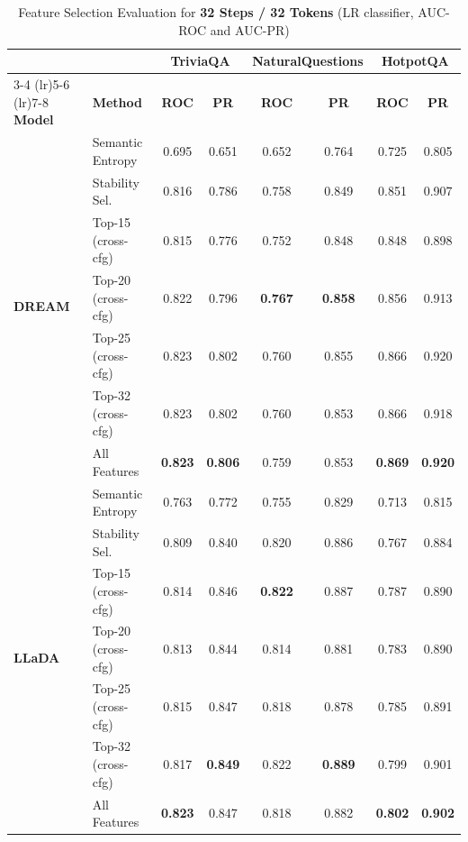 \documentclass{article}
\begin{document}
\begin{table}[htbp]
\centering
\small
\caption{Feature Selection Evaluation for \textbf{32 Steps / 32 Tokens} (LR classifier, AUC-ROC and AUC-PR)}
\label{tab:fs_32steps_32tokens}
\begin{tabular}{llcccccc}
\toprule
 & & \multicolumn{2}{c}{\textbf{TriviaQA}} & \multicolumn{2}{c}{\textbf{NaturalQuestions}} & \multicolumn{2}{c}{\textbf{HotpotQA}} \\
\cmidrule(lr){3-4} \cmidrule(lr){5-6} \cmidrule(lr){7-8}
\textbf{Model} & \textbf{Method} & \textbf{ROC} & \textbf{PR} & \textbf{ROC} & \textbf{PR} & \textbf{ROC} & \textbf{PR} \\
\midrule
\multirow{7}{*}{\textbf{DREAM}}
 & Semantic Entropy & 0.695 & 0.651 & 0.652 & 0.764 & 0.725 & 0.805 \\
 \cmidrule(lr){2-8}
 & Stability Sel. & 0.816 & 0.786 & 0.758 & 0.849 & 0.851 & 0.907 \\
 & Top-15 (cross-cfg) & 0.815 & 0.776 & 0.752 & 0.848 & 0.848 & 0.898 \\
 & Top-20 (cross-cfg) & 0.822 & 0.796 & \textbf{0.767} & \textbf{0.858} & 0.856 & 0.913 \\
 & Top-25 (cross-cfg) & 0.823 & 0.802 & 0.760 & 0.855 & 0.866 & 0.920 \\
 & Top-32 (cross-cfg) & 0.823 & 0.802 & 0.760 & 0.853 & 0.866 & 0.918 \\
 & All Features & \textbf{0.823} & \textbf{0.806} & 0.759 & 0.853 & \textbf{0.869} & \textbf{0.920} \\
\midrule
\multirow{7}{*}{\textbf{LLaDA}}
 & Semantic Entropy & 0.763 & 0.772 & 0.755 & 0.829 & 0.713 & 0.815 \\
 \cmidrule(lr){2-8}
 & Stability Sel. & 0.809 & 0.840 & 0.820 & 0.886 & 0.767 & 0.884 \\
 & Top-15 (cross-cfg) & 0.814 & 0.846 & \textbf{0.822} & 0.887 & 0.787 & 0.890 \\
 & Top-20 (cross-cfg) & 0.813 & 0.844 & 0.814 & 0.881 & 0.783 & 0.890 \\
 & Top-25 (cross-cfg) & 0.815 & 0.847 & 0.818 & 0.878 & 0.785 & 0.891 \\
 & Top-32 (cross-cfg) & 0.817 & \textbf{0.849} & 0.822 & \textbf{0.889} & 0.799 & 0.901 \\
 & All Features & \textbf{0.823} & 0.847 & 0.818 & 0.882 & \textbf{0.802} & \textbf{0.902} \\
\bottomrule
\end{tabular}
\end{table}
\newpage
\end{document}
